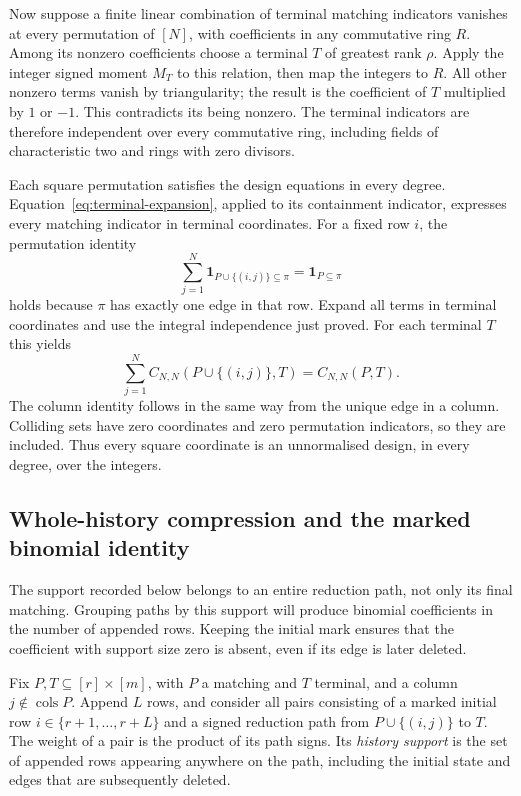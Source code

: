 Now suppose a finite linear combination of terminal matching indicators
vanishes at every permutation of $[N]$, with coefficients in any
commutative ring $R$.  Among its nonzero coefficients choose a terminal
$T$ of greatest rank $\rho$.  Apply the integer signed moment $M_T$ to
this relation, then map the integers to $R$.  All other nonzero terms
vanish by triangularity; the result is the coefficient of $T$ multiplied
by $1$ or $-1$.  This contradicts its being nonzero.  The terminal
indicators are therefore independent over every commutative ring,
including fields of characteristic two and rings with zero divisors.

Each square permutation satisfies the design equations in every degree.
Equation~\eqref{eq:terminal-expansion}, applied to its containment
indicator, expresses every matching indicator in terminal coordinates.
For a fixed row $i$, the permutation identity
\[
 \sum_{j=1}^{N}\boldsymbol{1}_{P\cup\{(i,j)\}\subseteq\pi}
       =\boldsymbol{1}_{P\subseteq\pi}
\]
holds because $\pi$ has exactly one edge in that row.  Expand all terms
in terminal coordinates and use the integral independence just proved.
For each terminal $T$ this yields
\[
 \sum_{j=1}^{N}C_{N,N}(P\cup\{(i,j)\},T)=C_{N,N}(P,T).
\]
The column identity follows in the same way from the unique edge in a
column.  Colliding sets have zero coordinates and zero permutation
indicators, so they are included.  Thus every square coordinate is an
unnormalised design, in every degree, over the integers.

\subsection{Whole-history compression and the marked binomial identity}
The support recorded below belongs to an entire reduction path, not
only its final matching. Grouping paths by this support will produce
binomial coefficients in the number of appended rows. Keeping the
initial mark ensures that the coefficient with support size zero is
absent, even if its edge is later deleted.

Fix $P,T\subseteq[r]\times[m]$, with $P$ a matching and $T$ terminal, and a column
$j\notin\operatorname{cols}P$.  Append $L$ rows, and consider all pairs
consisting of a marked initial row $i\in\{r+1,\ldots,r+L\}$ and a signed
reduction path from $P\cup\{(i,j)\}$ to $T$.  The weight of a pair is the
product of its path signs.  Its \emph{history support} is the set of
appended rows appearing anywhere on the path, including the initial
state and edges that are subsequently deleted.

